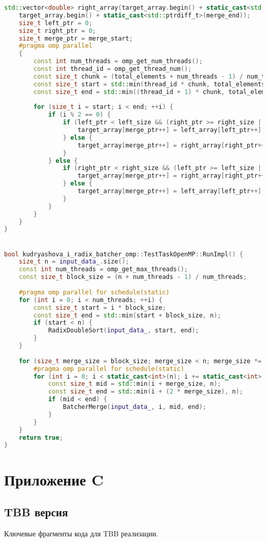 \documentclass[12pt,a4paper]{extarticle}
\newcommand{\appendixsection}[1]{%
	\clearpage
	\section*{\centering Приложение #1}
	\addcontentsline{toc}{section}{Приложение #1}
}
\begin{document}
\begin{lstlisting}[language=C++]
	std::vector<double> right_array(target_array.begin() + static_cast<std::ptrdiff_t>(mid_point),
	target_array.begin() + static_cast<std::ptrdiff_t>(merge_end));
	size_t left_ptr = 0;
	size_t right_ptr = 0;
	size_t merge_ptr = merge_start;
	#pragma omp parallel
	{
		const int num_threads = omp_get_num_threads();
		const int thread_id = omp_get_thread_num();
		const size_t chunk = (total_elements + num_threads - 1) / num_threads;
		const size_t start = std::min(thread_id * chunk, total_elements);
		const size_t end = std::min((thread_id + 1) * chunk, total_elements);
		
		for (size_t i = start; i < end; ++i) {
			if (i % 2 == 0) {
				if (left_ptr < left_size && (right_ptr >= right_size || left_array[left_ptr] <= right_array[right_ptr])) {
					target_array[merge_ptr++] = left_array[left_ptr++];
				} else {
					target_array[merge_ptr++] = right_array[right_ptr++];
				}
			} else {
				if (right_ptr < right_size && (left_ptr >= left_size || right_array[right_ptr] <= left_array[left_ptr])) {
					target_array[merge_ptr++] = right_array[right_ptr++];
				} else {
					target_array[merge_ptr++] = left_array[left_ptr++];
				}
			}
		}
	}
}


bool kudryashova_i_radix_batcher_omp::TestTaskOpenMP::RunImpl() {
	size_t n = input_data_.size();
	const int num_threads = omp_get_max_threads();
	const size_t block_size = (n + num_threads - 1) / num_threads;
	
	#pragma omp parallel for schedule(static)
	for (int i = 0; i < num_threads; ++i) {
		const size_t start = i * block_size;
		const size_t end = std::min(start + block_size, n);
		if (start < n) {
			RadixDoubleSort(input_data_, start, end);
		}
	}
	
	for (size_t merge_size = block_size; merge_size < n; merge_size *= 2) {
		#pragma omp parallel for schedule(static)
		for (int i = 0; i < static_cast<int>(n); i += static_cast<int>(2 * merge_size)) {
			const size_t mid = std::min(i + merge_size, n);
			const size_t end = std::min(i + (2 * merge_size), n);
			if (mid < end) {
				BatcherMerge(input_data_, i, mid, end);
			}
		}
	}
	return true;
}
\end{lstlisting}

\appendixsection{C}
\subsection*{TBB версия}
Ключевые фрагменты кода для TBB реализации.
\end{document}
